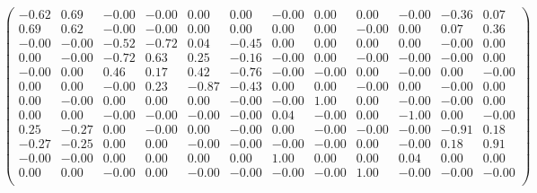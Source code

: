 $\left(\begin{matrix}-0.62&0.69&-0.00&-0.00&0.00&0.00&-0.00&0.00&0.00&-0.00&-0.36&0.07\\ 
0.69&0.62&-0.00&-0.00&0.00&0.00&0.00&0.00&-0.00&0.00&0.07&0.36\\ 
-0.00&-0.00&-0.52&-0.72&0.04&-0.45&0.00&0.00&0.00&0.00&-0.00&0.00\\ 
0.00&-0.00&-0.72&0.63&0.25&-0.16&-0.00&0.00&-0.00&-0.00&-0.00&0.00\\ 
-0.00&0.00&0.46&0.17&0.42&-0.76&-0.00&-0.00&0.00&-0.00&0.00&-0.00\\ 
0.00&0.00&-0.00&0.23&-0.87&-0.43&0.00&0.00&-0.00&0.00&-0.00&0.00\\ 
0.00&-0.00&0.00&0.00&0.00&-0.00&-0.00&1.00&0.00&-0.00&-0.00&0.00\\ 
0.00&0.00&-0.00&-0.00&-0.00&-0.00&0.04&-0.00&0.00&-1.00&0.00&-0.00\\ 
0.25&-0.27&0.00&-0.00&0.00&-0.00&0.00&-0.00&-0.00&-0.00&-0.91&0.18\\ 
-0.27&-0.25&0.00&0.00&-0.00&-0.00&-0.00&-0.00&0.00&-0.00&0.18&0.91\\ 
-0.00&-0.00&0.00&0.00&0.00&0.00&1.00&0.00&0.00&0.04&0.00&0.00\\ 
0.00&0.00&-0.00&0.00&-0.00&-0.00&-0.00&-0.00&1.00&-0.00&-0.00&-0.00\\ 
\end{matrix}\right)$
